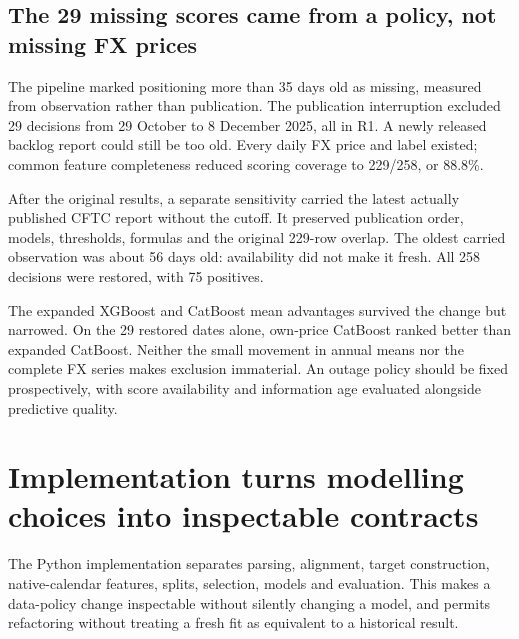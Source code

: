 \documentclass[11pt,a4paper]{article}
\begin{document}
\subsection*{The 29 missing scores came from a policy, not missing FX prices}
The pipeline marked positioning more than 35 days old as missing, measured from observation rather than publication. The publication interruption excluded 29 decisions from 29 October to 8 December 2025, all in R1. A newly released backlog report could still be too old. Every daily FX price and label existed; common feature completeness reduced scoring coverage to 229/258, or 88.8\%.

After the original results, a separate sensitivity carried the latest actually published CFTC report without the cutoff. It preserved publication order, models, thresholds, formulas and the original 229-row overlap. The oldest carried observation was about 56 days old: availability did not make it fresh. All 258 decisions were restored, with 75 positives.



The expanded XGBoost and CatBoost mean advantages survived the change but narrowed. On the 29 restored dates alone, own-price CatBoost ranked better than expanded CatBoost. Neither the small movement in annual means nor the complete FX series makes exclusion immaterial. An outage policy should be fixed prospectively, with score availability and information age evaluated alongside predictive quality.

\nextpage
\section*{Implementation turns modelling choices into inspectable contracts}
The Python implementation separates parsing, alignment, target construction, native-calendar features, splits, selection, models and evaluation. This makes a data-policy change inspectable without silently changing a model, and permits refactoring without treating a fresh fit as equivalent to a historical result.
\end{document}
